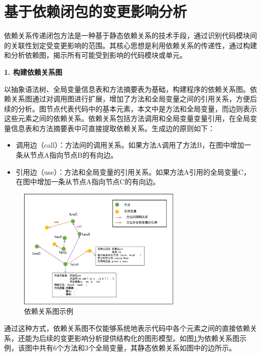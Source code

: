 \section{基于依赖闭包的变更影响分析}

依赖关系传递闭包方法是一种基于静态依赖关系的技术手段，通过识别代码模块间的关联性划定受变更影响的范围\cite{2021Improving}。其核心思想是利用依赖关系的传递性，通过构建和分析依赖图，揭示所有可能受到影响的代码模块或单元。

\noindent \textbf{1. 构建依赖关系图}
\label{1_代码依赖图}



以抽象语法树、全局变量信息表和方法摘要表为基础，构建程序的依赖关系图。依赖关系图通过对调用图进行扩展，增加了方法和全局变量之间的引用关系，方便后续的分析。图节点代表代码中的基本元素，本文中是方法和全局变量，而边则表示这些元素之间的依赖关系。依赖关系包括方法调用和全局变量变量引用，在全局变量信息表和方法摘要表中可直接提取依赖关系。生成边的原则如下：
\begin{itemize}
    \item 调用边（call）：方法间的调用关系。如果方法A调用了方法B，在图中增加一条从节点A指向节点B的有向边。
    
    \item 引用边（use）：方法和全局变量的引用关系。如果方法A引用的全局变量C，在图中增加一条从节点A指向节点C的有向边。
\end{itemize}


\begin{figure}[htbp]
    \centering
    \includegraphics[width = 0.7\textwidth]{figures/依赖关系图.png}
    \caption{依赖关系图示例}
    \label{1_依赖图示例}
    \end{figure}


通过这种方式，依赖关系图不仅能够系统地表示代码中各个元素之间的直接依赖关系，还能为后续的变更影响分析提供结构化的图形模型。如图\ref{1_依赖图示例}为依赖关系图示例，该图中共有6个方法和3个全局变量，其静态依赖关系如图中的边所示。


